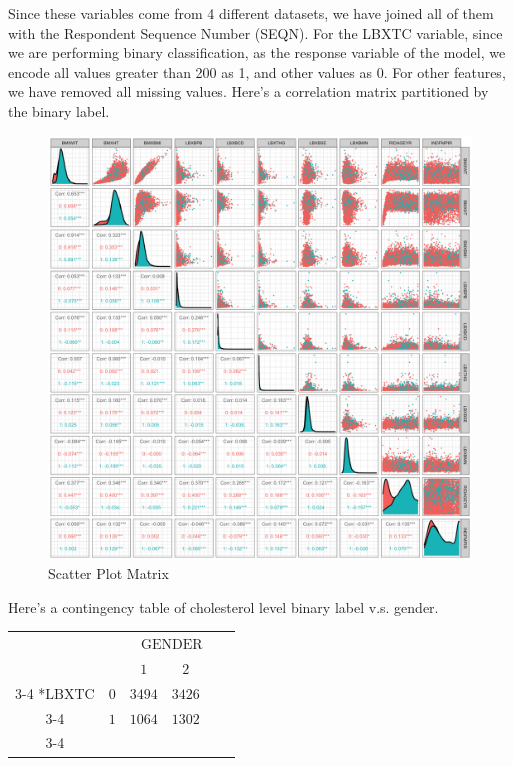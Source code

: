 \documentclass{article}
\begin{document}
Since these variables come from 4 different datasets, we have joined all of them with the Respondent Sequence Number (SEQN). For the LBXTC variable, since we are performing binary classification, as the response variable of the model, we encode all values greater than 200 as 1, and other values as 0. For other features, we have removed all missing values. Here's a correlation matrix partitioned by the binary label.
\begin{figure}[!ht]
\centering
\includegraphics[width=15cm]{data_visual.png}
\caption{Scatter Plot Matrix}
\end{figure}

\noindent Here's a contingency table of cholesterol level binary label v.s. gender.
    \begin{center}
        \begin{tabular}{cc|c|c|c|c|}
          & \multicolumn{1}{c}{} & \multicolumn{3}{c}{$\text{GENDER}$}\\
          & \multicolumn{1}{c}{} & \multicolumn{1}{c}{$1$}
          & \multicolumn{1}{c}{$2$}\\\cline{3-4}
          \multirow{2}*{$\text{LBXTC}$}  
          & $0$ & $3494$ & $3426$ \\\cline{3-4}
          & $1$ & $1064$ & $1302$ \\\cline{3-4}\\
        \end{tabular} 
    \end{center}
\end{document}
